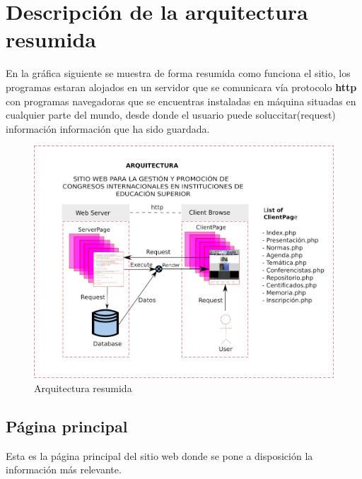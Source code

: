 \documentclass[a4paper,14px]{article}
\begin{document}
\section{Descripción de la arquitectura resumida}
\label{sec:descripcion-de-la}


En la gráfica siguiente se muestra de forma resumida como funciona el sitio, los programas estaran alojados en un servidor que se comunicara vía protocolo \textbf{http} con programas navegadoras que se encuentras instaladas en máquina situadas en cualquier parte del mundo, desde donde el usuario puede soluccitar(request) información información que ha sido guardada. \\


\begin{figure}[H]
  \centering
  \includegraphics[scale=0.3]{congresoweb.jpg}
  \caption{Arquitectura resumida}
  \label{fig:arquitectura}
\end{figure}


\newpage
\subsection{Página principal}
\label{sec:pagina-principal}

Esta es la página principal del sitio web donde se pone a disposición la información más relevante.
\end{document}
